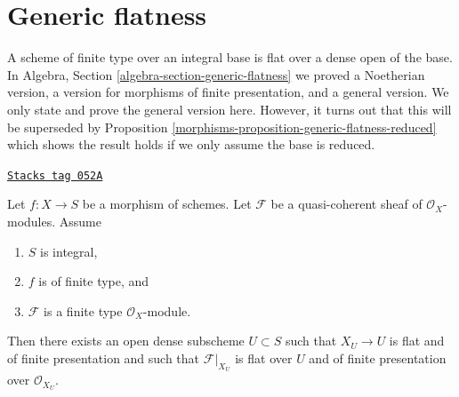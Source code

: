 \section{Generic flatness}
\label{morphisms-section-generic-flatness}
A scheme of finite type over an integral base is flat over a dense
open of the base. In
Algebra, Section \ref{algebra-section-generic-flatness}
we proved a Noetherian version, a version for morphisms of finite presentation,
and a general version. We only state and prove the general version here.
However, it turns out that this will be superseded by
Proposition \ref{morphisms-proposition-generic-flatness-reduced}
which shows the result holds if we only assume the base is reduced.

\begin{proposition}

\label{morphisms-proposition-generic-flatness}
\href{https://stacks.math.columbia.edu/tag/052A}{\texttt{Stacks tag 052A}}

Let $f : X \to S$ be a morphism of schemes.
Let $\mathcal{F}$ be a quasi-coherent sheaf of $\mathcal{O}_X$-modules.
Assume
\begin{enumerate}
\item $S$ is integral,
\item $f$ is of finite type, and
\item $\mathcal{F}$ is a finite type $\mathcal{O}_X$-module.
\end{enumerate}
Then there exists an open dense subscheme $U \subset S$ such that
$X_U \to U$ is flat and of finite presentation and such that
$\mathcal{F}|_{X_U}$ is flat over $U$ and of finite presentation
over $\mathcal{O}_{X_U}$.
\end{proposition}

